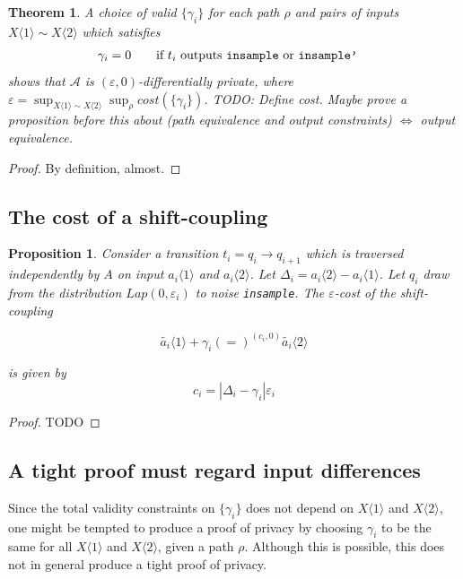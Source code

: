 \documentclass{article}
\newtheorem{theorem}{Theorem}
\newtheorem{proposition}{Proposition}[section]
\renewcommand{\epsilon}{\varepsilon}
\newcommand{\1}{\langle 1 \rangle}
\newcommand{\2}{\langle 2 \rangle}
\begin{document}
\begin{theorem}
    A choice of valid $\{\gamma_i\}$ for each path $\rho$ and pairs of inputs $X \1 \sim X\2$ which satisfies 
    \begin{align*}
        \gamma_i = 0 \qquad &\text{if } t_i \text{ outputs \texttt{insample} or \texttt{insample'}} 
    \end{align*} 
    shows that $\mathcal{A}$ is $(\epsilon, 0)$-differentially private, where $\epsilon = \sup_{X \1 \sim X \2} \sup_{\rho} cost(\{\gamma_i\})$. TODO: Define cost. Maybe prove a proposition before this about (path equivalence and output constraints) $\iff$ output equivalence.
\end{theorem}

\begin{proof}
    By definition, almost. 
\end{proof}

\subsection{The cost of a shift-coupling}

\begin{proposition}
    Consider a transition $t_i = q_{i} \to q_{i + 1}$ which is traversed independently by $A$ on input $a_i \1$ and $a_i \2$. Let $\Delta_i = a_i \2 - a_i \1$. Let $q_i$ draw from the distribution $Lap(0, \epsilon_i)$ to noise \texttt{insample}. The $\epsilon$-cost of the shift-coupling 

    \[\tilde{a_i} \1 + \gamma_i (=)^{(c_i, 0)} \tilde{a_i} \2\]

    is given by \[c_i = |\Delta_i - \gamma_i| \epsilon_i \]
\end{proposition} 

\begin{proof}
    TODO
\end{proof}

\subsection{A tight proof must regard input differences}

Since the total validity constraints on $\{\gamma_i\}$ does not depend on $X \1$ and $X \2$, one might be tempted to produce a proof of privacy by choosing $\gamma_i$ to be the same for all $X \1$ and $X \2$, given a path $\rho$. Although this is possible, this does not in general produce a tight proof of privacy.
\end{document}
